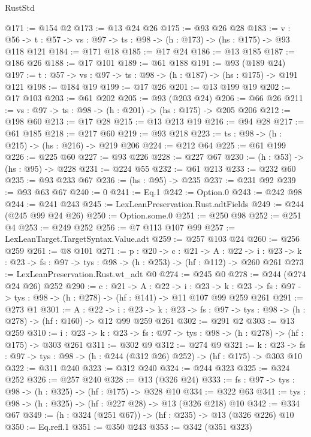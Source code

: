 \begin{lexlean}{RustStd}
\begin{coremodule}
@171 := @154 @2
@173 := @13 @24 @26
@175 := @93 @26 @28
@183 := {v : @56} ->
  {t : @57} -> {vs : @97} -> {ts : @98} -> (h : @173) -> (hs : @175) -> @93 @118 @121
@184 := @171 @18
@185 := @17 @24
@186 := @13 @185
@187 := @186 @26
@188 := @17 @101
@189 := @61 @188
@191 := @93 (@189 @24)
@197 := {t : @57} -> {vs : @97} -> {ts : @98} -> (h : @187) -> (hs : @175) -> @191 @121
@198 := @184 @19
@199 := @17 @26
@201 := @13 @199 @19
@202 := @17 @103
@203 := @61 @202
@205 := @93 (@203 @24)
@206 := @66 @26
@211 := {vs : @97} -> {ts : @98} -> (h : @201) -> (hs : @175) -> @205 @206
@212 := @198 @60
@213 := @17 @28
@215 := @13 @213 @19
@216 := @94 @28
@217 := @61 @185
@218 := @217 @60
@219 := @93 @218
@223 := {ts : @98} -> (h : @215) -> (hs : @216) -> @219 @206
@224 := @212 @64
@225 := @61 @199
@226 := @225 @60
@227 := @93 @226
@228 := @227 @67
@230 := (h : @53) -> (hs : @95) -> @228
@231 := @224 @55
@232 := @61 @213
@233 := @232 @60
@235 := @93 @233 @67
@236 := (hs : @95) -> @235
@237 := @231 @92
@239 := @93 @63 @67
@240 := 0
@241 := Eq.{1}
@242 := Option.{0}
@243 := @242 @98
@244 := @241 @243
@245 := LexLeanPreservation.Rust.adtFields
@249 := @244 (@245 @99 @24 @26)
@250 := Option.some.{0}
@251 := @250 @98
@252 := @251 @4
@253 := @249 @252
@256 := @7 @113 @107 @99
@257 := LexLeanTarget.TargetSyntax.Value.adt
@259 := @257 @103 @24
@260 := @256 @259
@261 := @8 @101
@271 := {p : @20} ->
  {c : @21} ->
  {A : @22} ->
  {i : @23} -> {k : @23} -> {fs : @97} -> {tys : @98} -> (h : @253) -> (hf : @112) -> @260 @261
@273 := LexLeanPreservation.Rust.wt_adt @0
@274 := @245 @0
@278 := @244 (@274 @24 @26) @252
@290 := {c : @21} ->
  {A : @22} ->
  {i : @23} ->
  {k : @23} -> {fs : @97} -> {tys : @98} -> (h : @278) -> (hf : @141) -> @11 @107 @99 @259 @261
@291 := @273 @1
@301 := {A : @22} ->
  {i : @23} ->
  {k : @23} -> {fs : @97} -> {tys : @98} -> (h : @278) -> (hf : @160) -> @12 @99 @259 @261
@302 := @291 @2
@303 := @13 @259
@310 := {i : @23} ->
  {k : @23} -> {fs : @97} -> {tys : @98} -> (h : @278) -> (hf : @175) -> @303 @261
@311 := @302 @9
@312 := @274 @9
@321 := {k : @23} ->
  {fs : @97} -> {tys : @98} -> (h : @244 (@312 @26) @252) -> (hf : @175) -> @303 @10
@322 := @311 @240
@323 := @312 @240
@324 := @244 @323
@325 := @324 @252
@326 := @257 @240
@328 := @13 (@326 @24)
@333 := {fs : @97} -> {tys : @98} -> (h : @325) -> (hf : @175) -> @328 @10
@334 := @322 @63
@341 := {tys : @98} -> (h : @325) -> (hf : @227 @28) -> @13 (@326 @218) @10
@342 := @334 @67
@349 := (h : @324 (@251 @67)) -> (hf : @235) -> @13 (@326 @226) @10
@350 := Eq.refl.{1}
@351 := @350 @243
@353 := @342 (@351 @323)

\end{coremodule}
\end{lexlean}
